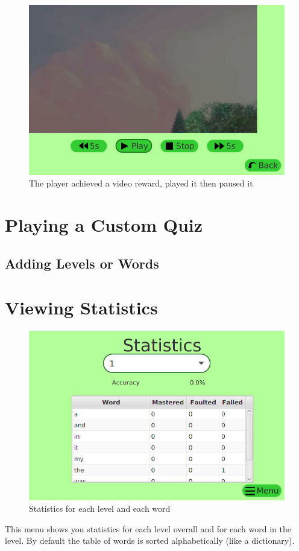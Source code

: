 \documentclass[12pt,a4paper,titlepage,onecolumn]{article}
\begin{document}
\begin{figure}
\centering
\includegraphics[width=1\linewidth]{Figures/NewQuiz/VideoReward/VideoRewardPaused}
\caption[Video Reward Paused]{The player achieved a video reward, played it then paused it}
\label{fig:VideoRewardPaused}
\end{figure}


	\section{Playing a Custom Quiz}
	\subsection{Adding Levels or Words}\label{addlist}
		
	\section{Viewing Statistics}
	\begin{figure}[h]
	\centering
	\includegraphics[width=1\linewidth]{Figures/Statistics/StatisticsGeneral}
	\caption[Statistics Menu]{Statistics for each level and each word}
	\label{fig:StatisticsGeneral}
	\end{figure}
	This menu shows you statistics for each level overall and for each word in the level. By default the table of words is sorted alphabetically (like a dictionary).
\end{document}
